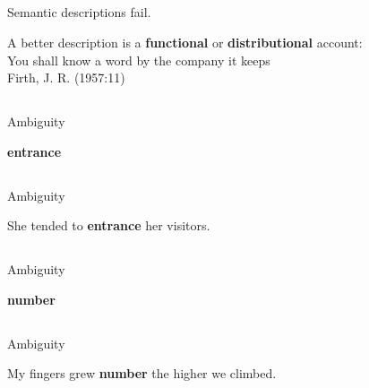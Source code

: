 \documentclass[9pt,xcolor=pdftex,dvipsnames,table]{beamer}
\begin{document}
\subsection{}
\begin{frame}{Semantic descriptions fail.}

	{A better description is a \textbf{functional} or \textbf{distributional} account:}\\
	\vspace{.5cm}
	{\huge You shall know a word by the company it keeps}\\Firth, J. R. (1957:11)
\end{frame}



\subsection{}
\begin{frame}{Ambiguity}
	\begin{center}
		{\huge \textbf{entrance}}
	\end{center}
\end{frame}

\subsection{}
\begin{frame}{Ambiguity}
	\begin{center}
		{\huge She tended to \textbf{entrance} her visitors.}
	\end{center}
\end{frame}

\subsection{}
\begin{frame}{Ambiguity}
	\begin{center}
		{\huge \textbf{number}}
	\end{center}
\end{frame}

\subsection{}
\begin{frame}{Ambiguity}
	\begin{center}
		{\huge My fingers grew \textbf{number} the higher we climbed.}
	\end{center}
\end{frame}
\end{document}
